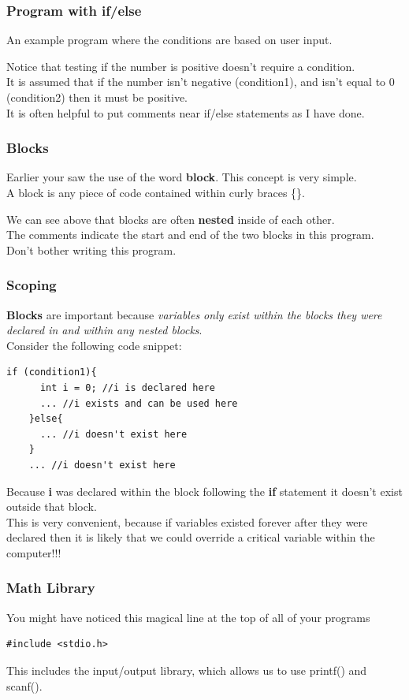 \documentclass{beamer}
\begin{document}
\begin{frame}
  \frametitle{Program with if/else}
  An example program where the conditions are based on user input.
  
  Notice that testing if the number is positive doesn't require a condition.\\
  It is assumed that if the number isn't negative (condition1), 
  and isn't equal to 0 (condition2)
  then it must be positive.\\
  It is often helpful to put comments near if/else statements as I have done.
\end{frame}

\begin{frame}[fragile]
  \frametitle{Blocks}
  Earlier your saw the use of the word \textbf{block}. 
  This concept is very simple.\\
  A block is any piece of code contained within curly braces \{\}.
  
  We can see above that blocks are 
  often \textbf{nested} inside of each other.\\
  The comments indicate the start and end of the two blocks in this program.\\
  Don't bother writing this program.
\end{frame}

\begin{frame}
  \frametitle{Scoping}
  \textbf{Blocks} are important because \textit{variables only 
    exist within the blocks they were declared in and 
    within any nested blocks}.\\
  Consider the following code snippet:
  \begin{lstlisting}[style=customc]
    if (condition1){
      int i = 0; //i is declared here
      ... //i exists and can be used here
    }else{
      ... //i doesn't exist here
    }
    ... //i doesn't exist here
  \end{lstlisting}
  Because \textbf{i} was declared within the block following 
  the \textbf{if} statement it doesn't
  exist outside that block.\\
  This is very convenient, because if variables existed forever after 
  they were declared then it is likely
  that we could override a critical variable within the computer!!!
\end{frame}

\begin{frame}[fragile]
  \frametitle{Math Library}
  You might have noticed this magical line at the top of all of your programs
  \begin{lstlisting}[style=customc]
    #include <stdio.h>
  \end{lstlisting}
  This includes the input/output library, 
  which allows us to use printf() and scanf().\\
\end{frame}
\end{document}
